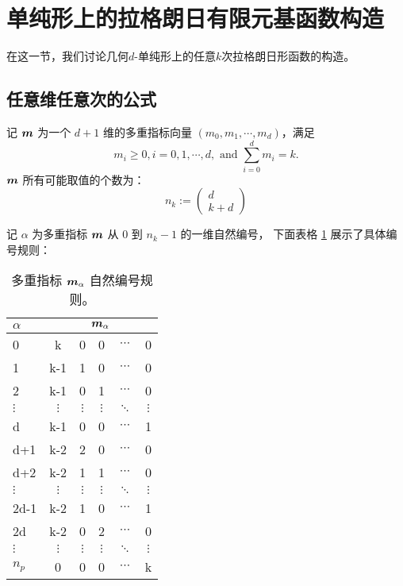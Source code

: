 \documentclass{article}
\begin{document}
\section{单纯形上的拉格朗日有限元基函数构造}

在这一节，我们讨论几何$d$-单纯形上的任意$k$次拉格朗日形函数的构造。

\subsection{任意维任意次的公式}

记 ${\boldsymbol m}$ 为一个 $d+1$ 维的多重指标向量 $(m_0, m_1, \cdots, m_d)$，满足  
\begin{equation*}
    m_i \geq 0, i=0, 1, \cdots, d, \text{ and } \sum_{i=0}^d m_i=k.
\end{equation*}
${\boldsymbol m}$ 所有可能取值的个数为： 
\begin{equation*}
    n_k := \begin{pmatrix}
        d \\ k+d 
    \end{pmatrix}
\end{equation*}

记 $\alpha$ 为多重指标 ${\boldsymbol m}$ 从 0 到 $n_k-1$ 的一维自然编号， 下面表格
\ref{tb:num} 展示了具体编号规则：
\begin{table}[H]
    \centering
    \begin{tabular}{| l | c | c | c | c | c|}
    \hline
    $\alpha$ & \multicolumn{5}{c|}{${\boldsymbol m}_\alpha$} \\\hline
    0 & k   & 0 & 0 & $\cdots$ & 0 \\\hline
    1 & k-1 & 1 & 0 & $\cdots$ & 0 \\\hline
    2 & k-1 & 0 & 1 & $\cdots$ & 0 \\\hline
    $\vdots$ & $\vdots$ & $\vdots$ & $\vdots$ & $\ddots$ & $\vdots$ \\\hline
    d & k-1 & 0 & 0 & $\cdots$ & 1 \\\hline
    d+1 & k-2 & 2 & 0 & $\cdots$ & 0 \\\hline
    d+2 & k-2 & 1 & 1 & $\cdots$ & 0 \\\hline
    $\vdots$ & $\vdots$ & $\vdots$ & $\vdots$ & $\ddots$ & $\vdots$ \\\hline
    2d-1 & k-2 & 1 & 0 & $\cdots$ & 1 \\\hline
    2d & k-2 & 0 & 2 & $\cdots$ & 0 \\\hline
    $\vdots$ & $\vdots$ & $\vdots$ & $\vdots$ & $\ddots$ & $\vdots$ \\\hline
    $n_p$ & 0 & 0 & 0 & $\cdots$ & k \\
    \hline
    \end{tabular}
    \caption{多重指标 ${\boldsymbol m}_\alpha$ 自然编号规则。}\label{tb:num}
\end{table}
\end{document}
